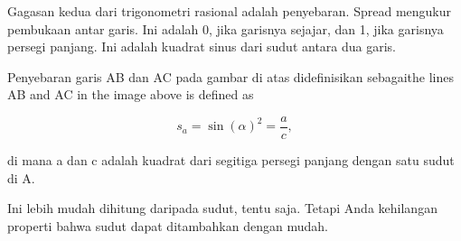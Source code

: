 \documentclass[a4paper,10pt]{article}
\begin{document}
\begin{eulernotebook}
\begin{eulercomment}
\begin{eulercomment}
\begin{eulercomment}
\begin{eulercomment}
\begin{eulercomment}
\begin{eulercomment}
\begin{eulercomment}
\begin{eulercomment}
\begin{eulercomment}
\begin{eulercomment}
\begin{eulercomment}
\begin{eulercomment}
\begin{eulercomment}
\begin{eulercomment}
\begin{eulercomment}
\begin{eulercomment}
\begin{eulercomment}
\begin{eulercomment}
\begin{eulercomment}
\begin{eulercomment}
\begin{eulercomment}
\begin{eulercomment}
\begin{eulercomment}
\begin{eulercomment}
\begin{eulercomment}
\begin{eulercomment}
\begin{eulercomment}
\begin{eulercomment}
\begin{eulercomment}
\begin{eulercomment}
\begin{eulercomment}
\begin{eulercomment}
\begin{eulercomment}
\begin{eulercomment}
\begin{eulercomment}
\begin{eulercomment}
\begin{eulercomment}
\begin{eulercomment}
\begin{eulercomment}
\begin{eulercomment}
\begin{euleroutput}
\end{euleroutput}
\begin{eulercomment}
Gagasan kedua dari trigonometri rasional adalah penyebaran. Spread
mengukur pembukaan antar garis. Ini adalah 0, jika garisnya sejajar,
dan 1, jika garisnya persegi panjang. Ini adalah kuadrat sinus dari
sudut antara dua garis.

Penyebaran garis AB dan AC pada gambar di atas didefinisikan
sebagaithe lines AB and AC in the image above is defined as

\end{eulercomment}
\begin{eulerformula}
\[
s_a = \sin(\alpha)^2 = \frac{a}{c},
\]
\end{eulerformula}
\begin{eulercomment}
di mana a dan c adalah kuadrat dari segitiga persegi panjang dengan
satu sudut di A.
\end{eulercomment}
\begin{eulercomment}
Ini lebih mudah dihitung daripada sudut, tentu saja. Tetapi Anda
kehilangan properti bahwa sudut dapat ditambahkan dengan mudah.


\end{eulercomment}
\end{eulercomment}
\end{eulercomment}
\end{eulercomment}
\end{eulercomment}
\end{eulercomment}
\end{eulercomment}
\end{eulercomment}
\end{eulercomment}
\end{eulercomment}
\end{eulercomment}
\end{eulercomment}
\end{eulercomment}
\end{eulercomment}
\end{eulercomment}
\end{eulercomment}
\end{eulercomment}
\end{eulercomment}
\end{eulercomment}
\end{eulercomment}
\end{eulercomment}
\end{eulercomment}
\end{eulercomment}
\end{eulercomment}
\end{eulercomment}
\end{eulercomment}
\end{eulercomment}
\end{eulercomment}
\end{eulercomment}
\end{eulercomment}
\end{eulercomment}
\end{eulercomment}
\end{eulercomment}
\end{eulercomment}
\end{eulercomment}
\end{eulercomment}
\end{eulercomment}
\end{eulercomment}
\end{eulercomment}
\end{eulercomment}
\end{eulercomment}
\end{eulernotebook}
\end{document}
